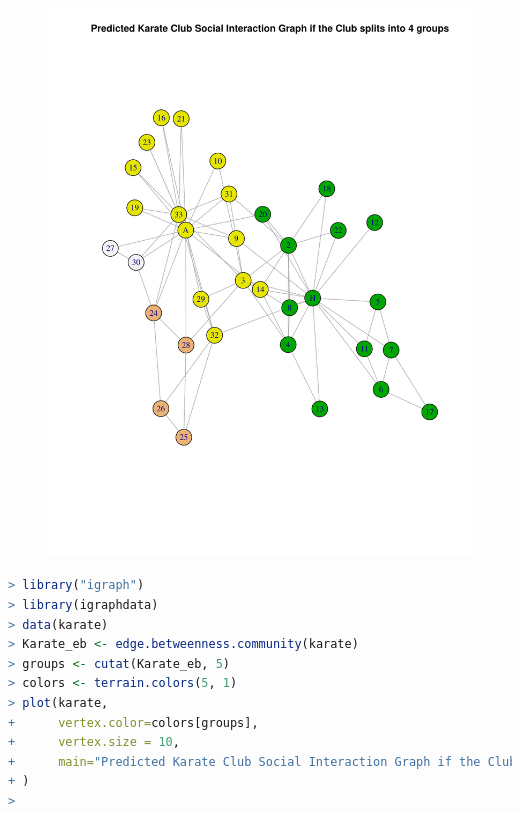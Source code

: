 \documentclass[a4paper, 11pt]{article}
\begin{document}
\begin{figure}[H]
\centering
\includegraphics[scale=0.7]{4.pdf}
\end{figure}

\pagebreak


\begin{lstlisting}[language=R, breakatwhitespace=〈false), label=Predicted Karate Club Social Interaction Graph if the Club splits into 5 groups in R, caption= Predicted Karate Club Social Interaction Graph if the Club splits into 5 groups in R]
> library("igraph")
> library(igraphdata)
> data(karate)
> Karate_eb <- edge.betweenness.community(karate)
> groups <- cutat(Karate_eb, 5)
> colors <- terrain.colors(5, 1)
> plot(karate, 
+      vertex.color=colors[groups],
+      vertex.size = 10,
+      main="Predicted Karate Club Social Interaction Graph if the Club splits into 5 groups"
+ )
>
\end{lstlisting}
\end{document}
